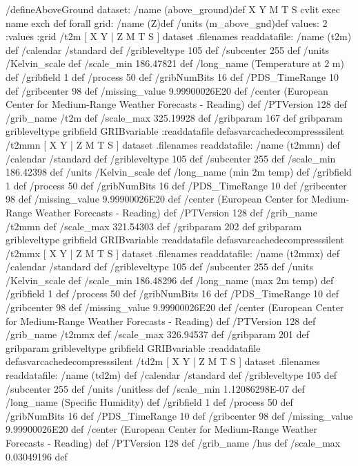 \begin{ingrid}
/defineAboveGround {
dataset:
/name (above_ground)def
{ X Y M T S} cvlit { exec name exch def} forall
grid:
/name (Z)def
/units (m_above_gnd)def
values: 2 :values
:grid
 /t2m{
[ X Y | Z M T S ] dataset .filenames readdatafile:
/name (t2m) def
 /calendar /standard def
 /gribleveltype 105 def
 /subcenter 255 def
 /units /Kelvin_scale def
 /scale_min 186.47821 def
 /long_name (Temperature at 2 m) def
 /gribfield 1 def
 /process 50 def
 /gribNumBits 16 def
 /PDS_TimeRange 10 def
 /gribcenter 98 def
 /missing_value 9.99900026E20 def
 /center (European Center for Medium-Range Weather Forecasts - Reading) def
 /PTVersion 128 def
 /grib_name /t2m def
 /scale_max 325.19928 def
 /gribparam 167 def
 gribparam gribleveltype gribfield GRIBvariable
 :readdatafile
}defasvarcachedecompresssilent
 /t2mmn{
[ X Y | Z M T S ] dataset .filenames readdatafile:
/name (t2mmn) def
 /calendar /standard def
 /gribleveltype 105 def
 /subcenter 255 def
 /scale_min 186.42398 def
 /units /Kelvin_scale def
 /long_name (min 2m temp) def
 /gribfield 1 def
 /process 50 def
 /gribNumBits 16 def
 /PDS_TimeRange 10 def
 /gribcenter 98 def
 /missing_value 9.99900026E20 def
 /center (European Center for Medium-Range Weather Forecasts - Reading) def
 /PTVersion 128 def
 /grib_name /t2mmn def
 /scale_max 321.54303 def
 /gribparam 202 def
 gribparam gribleveltype gribfield GRIBvariable
 :readdatafile
}defasvarcachedecompresssilent
 /t2mmx{
[ X Y | Z M T S ] dataset .filenames readdatafile:
/name (t2mmx) def
 /calendar /standard def
 /gribleveltype 105 def
 /subcenter 255 def
 /units /Kelvin_scale def
 /scale_min 186.48296 def
 /long_name (max 2m temp) def
 /gribfield 1 def
 /process 50 def
 /gribNumBits 16 def
 /PDS_TimeRange 10 def
 /gribcenter 98 def
 /missing_value 9.99900026E20 def
 /center (European Center for Medium-Range Weather Forecasts - Reading) def
 /PTVersion 128 def
 /grib_name /t2mmx def
 /scale_max 326.94537 def
 /gribparam 201 def
 gribparam gribleveltype gribfield GRIBvariable
 :readdatafile
}defasvarcachedecompresssilent
 /td2m{
[ X Y | Z M T S ] dataset .filenames readdatafile:
/name (td2m) def
 /calendar /standard def
 /gribleveltype 105 def
 /subcenter 255 def
 /units /unitless def
 /scale_min 1.12086298E-07 def
  /long_name (Specific Humidity) def
 /gribfield 1 def
 /process 50 def
 /gribNumBits 16 def
 /PDS_TimeRange 10 def
 /gribcenter 98 def
 /missing_value 9.99900026E20 def
 /center (European Center for Medium-Range Weather Forecasts - Reading) def
 /PTVersion 128 def
 /grib_name /hus def
 /scale_max 0.03049196 def
}}
\end{ingrid}
